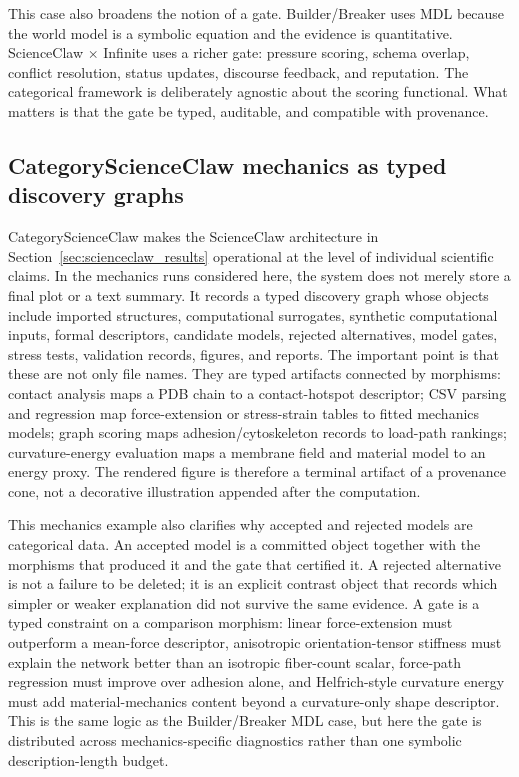 \documentclass[11pt]{article}
\theoremstyle{definition}
\begin{document}
This case also broadens the notion of a gate. Builder/Breaker uses MDL because the world model is a symbolic equation and the evidence is quantitative. ScienceClaw $\times$ Infinite uses a richer gate: pressure scoring, schema overlap, conflict resolution, status updates, discourse feedback, and reputation. The categorical framework is deliberately agnostic about the scoring functional. What matters is that the gate be typed, auditable, and compatible with provenance.


\FloatBarrier

\subsection{CategoryScienceClaw mechanics as typed discovery graphs}
\label{sec:categoryscienceclaw_mechanics}

CategoryScienceClaw makes the ScienceClaw architecture in Section~\ref{sec:scienceclaw_results} operational at the level of individual scientific claims. In the mechanics runs considered here, the system does not merely store a final plot or a text summary. It records a typed discovery graph whose objects include imported structures, computational surrogates, synthetic computational inputs, formal descriptors, candidate models, rejected alternatives, model gates, stress tests, validation records, figures, and reports. The important point is that these are not only file names. They are typed artifacts connected by morphisms: contact analysis maps a PDB chain to a contact-hotspot descriptor; CSV parsing and regression map force-extension or stress-strain tables to fitted mechanics models; graph scoring maps adhesion/cytoskeleton records to load-path rankings; curvature-energy evaluation maps a membrane field and material model to an energy proxy. The rendered figure is therefore a terminal artifact of a provenance cone, not a decorative illustration appended after the computation.

This mechanics example also clarifies why accepted and rejected models are categorical data. An accepted model is a committed object together with the morphisms that produced it and the gate that certified it. A rejected alternative is not a failure to be deleted; it is an explicit contrast object that records which simpler or weaker explanation did not survive the same evidence. A gate is a typed constraint on a comparison morphism: linear force-extension must outperform a mean-force descriptor, anisotropic orientation-tensor stiffness must explain the network better than an isotropic fiber-count scalar, force-path regression must improve over adhesion alone, and Helfrich-style curvature energy must add material-mechanics content beyond a curvature-only shape descriptor. This is the same logic as the Builder/Breaker MDL case, but here the gate is distributed across mechanics-specific diagnostics rather than one symbolic description-length budget.
\end{document}
